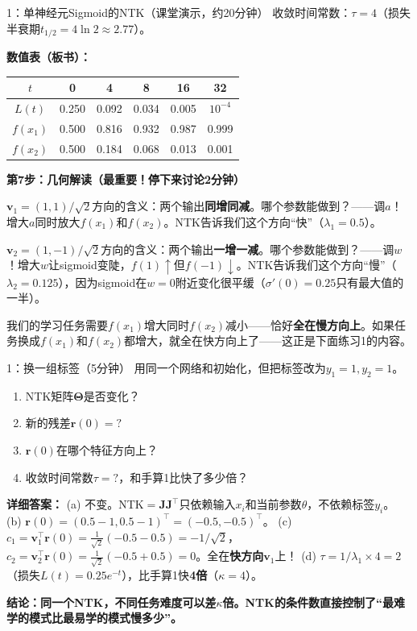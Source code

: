 \documentclass[11pt,a4paper]{article}
\newcommand{\bTheta}{\boldsymbol{\Theta}}
\newcommand{\bJ}{\mathbf{J}}
\newcommand{\br}{\mathbf{r}}
\newcommand{\bv}{\mathbf{v}}
\begin{document}
\begin{handcalc}{1：单神经元Sigmoid的NTK（课堂演示，约20分钟）}
收敛时间常数：$\tau = 4$（损失半衰期$t_{1/2}=4\ln 2\approx 2.77$）。

\textbf{数值表（板书）：}
\begin{center}
\begin{tabular}{c|ccccc}
\toprule
$t$ & 0 & 4 & 8 & 16 & 32 \\
\midrule
$L(t)$ & 0.250 & 0.092 & 0.034 & 0.005 & $10^{-4}$ \\
$f(x_1)$ & 0.500 & 0.816 & 0.932 & 0.987 & 0.999 \\
$f(x_2)$ & 0.500 & 0.184 & 0.068 & 0.013 & 0.001 \\
\bottomrule
\end{tabular}
\end{center}

\bigskip
\textbf{第7步：几何解读（最重要！停下来讨论2分钟）}

$\bv_1=(1,1)/\sqrt{2}$方向的含义：两个输出\textbf{同增同减}。哪个参数能做到？——调$a$！增大$a$同时放大$f(x_1)$和$f(x_2)$。NTK告诉我们这个方向``快''（$\lambda_1=0.5$）。

$\bv_2=(1,-1)/\sqrt{2}$方向的含义：两个输出\textbf{一增一减}。哪个参数能做到？——调$w$！增大$w$让sigmoid变陡，$f(1)\uparrow$但$f(-1)\downarrow$。NTK告诉我们这个方向``慢''（$\lambda_2=0.125$），因为sigmoid在$w=0$附近变化很平缓（$\sigma'(0)=0.25$只有最大值的一半）。

我们的学习任务需要$f(x_1)$增大同时$f(x_2)$减小——恰好\textbf{全在慢方向上}。如果任务换成$f(x_1)$和$f(x_2)$都增大，就全在快方向上了——这正是下面练习1的内容。
\end{handcalc}

\begin{classexercise}{1：换一组标签（5分钟）}
用同一个网络和初始化，但把标签改为$y_1=1, y_2=1$。
\begin{enumerate}[label=(\alph*)]
\item NTK矩阵$\bTheta$是否变化？
\item 新的残差$\br(0) = ?$
\item $\br(0)$在哪个特征方向上？
\item 收敛时间常数$\tau = ?$，和手算1比快了多少倍？
\end{enumerate}

\medskip
\textbf{详细答案：}
(a) 不变。NTK$=\bJ\bJ^\top$只依赖输入$x_i$和当前参数$\theta$，不依赖标签$y_i$。
(b) $\br(0) = (0.5-1, 0.5-1)^\top = (-0.5, -0.5)^\top$。
(c) $c_1 = \bv_1^\top\br(0) = \frac{1}{\sqrt{2}}(-0.5-0.5) = -1/\sqrt{2}$，$c_2 = \bv_2^\top\br(0) = \frac{1}{\sqrt{2}}(-0.5+0.5)=0$。全在\textbf{快方向$\bv_1$}上！
(d) $\tau = 1/\lambda_1 \times 4 = 2$（损失$L(t)=0.25e^{-t}$），比手算1快\textbf{4倍}（$\kappa=4$）。

\textbf{结论：同一个NTK，不同任务难度可以差$\kappa$倍。NTK的条件数直接控制了``最难学的模式比最易学的模式慢多少''。}
\end{classexercise}
\end{document}
